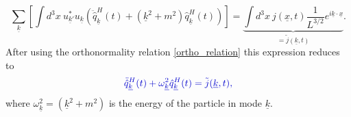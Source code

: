 \documentclass[
11pt, %
english, %
singlespacing, %
headsepline, %
]{MastersDoctoralThesis} %
\begin{document}
\begin{equation}
 \sum_{\underline{k}}
 \left[ 
 \int d^{3}x \ u^{\ast}_{\underline{k}'}u_{\underline{k}}
 \left( 
 \ddot{\hat{q}}^{H}_{\underline{k}}(t) 
 +
 \left( \underline{k}^{2}+m^{2}\right) 
 \hat{q}^{H}_{\underline{k}}(t) 
 \right) 
  \right] 
  ={\underbrace{\int d^{3}x \ 
j(\underline{x},t) \dfrac{1}{L^{3/2}} e^{i\underline{k}\cdot\underline{x}}}_{=\tilde{j}(\underline{k},t)}}
  .
\end{equation}
After using the orthonormality relation \eqref{ortho_relation} this expression reduces to
\begin{equation}\label{eq_for_q}
 \textcolor[RGB]{0,0,204}{
\ddot{\hat{q}}^{H}_{\underline{k}}(t) 
 +
\omega_{\underline{k}}^{2}
 \hat{q}^{H}_{\underline{k}}(t) 
  =\tilde{j}(\underline{k},t)
  ,}
\end{equation}
where  $ \omega_{\underline{k}}^{2} = (\underline{k}^{2}+m^{2})  $ is the energy of the particle in mode $ \underline{k} $.
\end{document}
